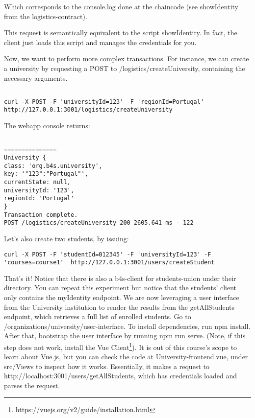 \documentclass[12pt,a4paper]{article}
\theoremstyle{definition}
\begin{document}
Which corresponds to the console.log done at the chaincode (see showIdentity from the logistics-contract).

This request is semantically equivalent to the script showIdentity. In fact, the client just loads this script and manages the credentials for you.



Now, we want to perform more complex transactions. For instance, we can create a university by requesting a POST to /logistics/createUniversity, containing the necessary arguments.
\begin{verbatim}

curl -X POST -F 'universityId=123' -F 'regionId=Portugal' http://127.0.0.1:3001/logistics/createUniversity
\end{verbatim}

The webapp console returns:

\begin{verbatim}

===============
University {
class: 'org.b4s.university',
key: '"123":"Portugal"',
currentState: null,
universityId: '123',
regionId: 'Portugal'
}
Transaction complete.
POST /logistics/createUniversity 200 2605.641 ms - 122

\end{verbatim}

Let's also create two students, by issuing:
\begin{verbatim}
curl -X POST -F 'studentId=012345' -F 'universityId=123' -F 'courses=course1'  http://127.0.0.1:3001/users/createStudent
\end{verbatim}



That's it! Notice that there is also a b4s-client for students-union under their directory. You can repeat this experiment but notice that the students' client only contains the myIdentity endpoint. We are now leveraging a user interface from the University institution to render the results from the getAllStudents endpoint, which retrieves a full list of enrolled students. Go to /organizations/university/user-interface. To install dependencies, run npm install. After that, bootstrap the user interface by running npm run serve. (Note, if this step does not work, install the Vue Client\footnote{https://vuejs.org/v2/guide/installation.html}). It is out of this course's scope to learn about Vue.js, but you can check the code at University-frontend.vue, under src/Views to inspect how it works. Essentially, it makes a request to http://localhost:3001/users/getAllStudents, which has credentials loaded and parses the request.
\end{document}
